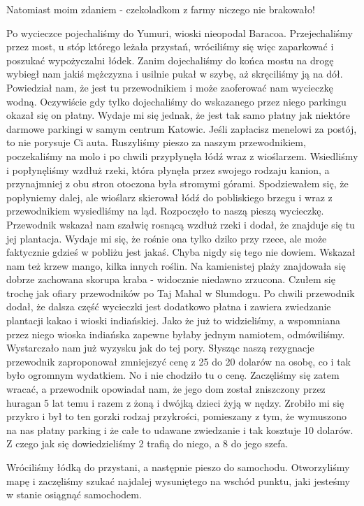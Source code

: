 Natomiast moim zdaniem - czekoladkom z farmy niczego nie brakowało!
\par Po wycieczce pojechaliśmy do Yumuri, wioski nieopodal Baracoa.
Przejechaliśmy przez most, u stóp którego leżała przystań, wróciliśmy się więc zaparkować i poszukać wypożyczalni łódek.
Zanim dojechaliśmy do końca mostu na drogę wybiegł nam jakiś mężczyzna i usilnie pukał w szybę, aż skręciliśmy ją na dół.
Powiedział nam, że jest tu przewodnikiem i może zaoferować nam wycieczkę wodną.
Oczywiście gdy tylko dojechaliśmy do wskazanego przez niego parkingu okazał się on płatny.
Wydaje mi się jednak, że jest tak samo płatny jak niektóre darmowe parkingi w samym centrum Katowic.
Jeśli zapłacisz menelowi za postój, to nie porysuje Ci auta.
Ruszyliśmy pieszo za naszym przewodnikiem, poczekaliśmy na molo i po chwili przypłynęła łódź wraz z wioślarzem.
Wsiedliśmy i popłynęliśmy wzdłuż rzeki, która płynęła przez swojego rodzaju kanion, a przynajmniej z obu stron otoczona była stromymi górami.
Spodziewałem się, że popłyniemy dalej, ale wioślarz skierował łódź do pobliskiego brzegu i wraz z przewodnikiem wysiedliśmy na ląd.
Rozpoczęło to naszą pieszą wycieczkę.
Przewodnik wskazał nam szałwię rosnącą wzdłuż rzeki i dodał, że znajduje się tu jej plantacja.
Wydaje mi się, że rośnie ona tylko dziko przy rzece, ale może faktycznie gdzieś w pobliżu jest jakaś.
Chyba nigdy się tego nie dowiem.
Wskazał nam też krzew mango, kilka innych roślin.
Na kamienistej plaży znajdowała się dobrze zachowana skorupa kraba - widocznie niedawno zrzucona.
Czułem się trochę jak ofiary przewodników po Taj Mahal w Slumdogu.
Po chwili przewodnik dodał, że dalsza część wycieczki jest dodatkowo płatna i zawiera zwiedzanie plantacji kakao i wioski indiańskiej.
Jako że już to widzieliśmy, a wspomniana przez niego wioska indiańska zapewne byłaby jednym namiotem, odmówiliśmy.
Wystarczało nam już wyzysku jak do tej pory.
Słysząc naszą rezygnacje przewodnik zaproponował zmniejszyć cenę z 25 do 20 dolarów na osobę, co i tak było ogromnym wydatkiem.
No i nie chodziło tu o cenę.
Zaczęliśmy się zatem wracać, a przewodnik opowiadał nam, że jego dom został zniszczony przez huragan 5 lat temu i razem z żoną i dwójką dzieci żyją w nędzy.
Zrobiło mi się przykro i był to ten gorzki rodzaj przykrości, pomieszany z tym, że wymuszono na nas płatny parking i że całe to udawane zwiedzanie i tak kosztuje 10 dolarów.
Z czego jak się dowiedzieliśmy 2 trafią do niego, a 8 do jego szefa.
\par Wróciliśmy łódką do przystani, a następnie pieszo do samochodu.
Otworzyliśmy mapę i zaczęliśmy szukać najdalej wysuniętego na wschód punktu, jaki jesteśmy w stanie osiągnąć samochodem.
